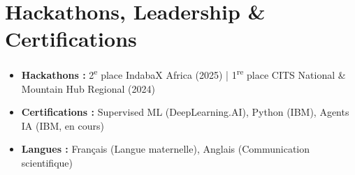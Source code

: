 \documentclass[a4paper,11pt]{article}
\begin{document}
\section{Hackathons, Leadership \& Certifications}
\begin{itemize}[leftmargin=*, nosep]
    \item \small{\textbf{Hackathons :} 2\textsuperscript{e} place IndabaX Africa (2025) | 1\textsuperscript{re} place CITS National \& Mountain Hub Regional (2024)}
    \item \small{\textbf{Certifications :} Supervised ML (DeepLearning.AI), Python (IBM), Agents IA (IBM, en cours)}
    \item \small{\textbf{Langues :} Français (Langue maternelle), Anglais (Communication scientifique)}
\end{itemize}
\end{document}
